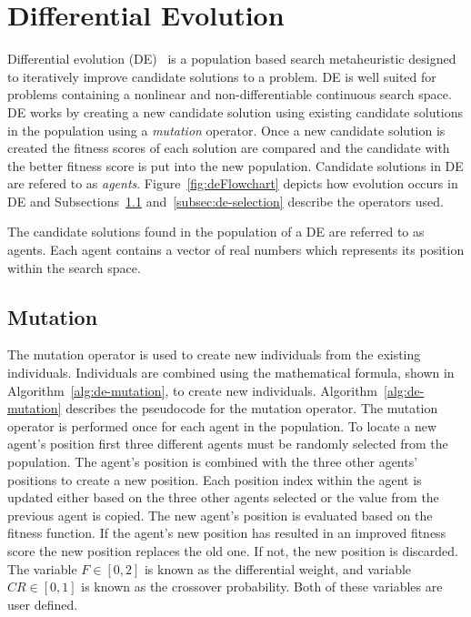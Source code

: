 \section{Differential Evolution}
\label{sec:de}

Differential evolution (DE)~\cite{storn1997differential} is a population based search metaheuristic designed to iteratively improve candidate solutions to a problem. DE is well suited for problems containing a nonlinear and non-differentiable continuous search space. DE works by creating a new candidate solution using existing candidate solutions in the population using a \textit{mutation} operator. Once a new candidate solution is created the fitness scores of each solution are compared and the candidate with the better fitness score is put into the new population. Candidate solutions in DE are refered to as \textit{agents}. Figure~\ref{fig:deFlowchart} depicts how evolution occurs in DE and Subsections~\ref{subsec:de-mutation} and~\ref{subsec:de-selection} describe the operators used.



The candidate solutions found in the population of a DE are referred to as agents. Each agent contains a vector of real numbers which represents its position within the search space.

\subsection{Mutation}
\label{subsec:de-mutation}

The mutation operator is used to create new individuals from the existing individuals. Individuals are combined using the mathematical formula, shown in Algorithm~\ref{alg:de-mutation}, to create new individuals. Algorithm~\ref{alg:de-mutation} describes the pseudocode for the mutation operator. The mutation operator is performed once for each agent in the population. To locate a new agent's position first three different agents must be randomly selected from the population. The agent's position is combined with the three other agents' positions to create a new position. Each position index within the agent is updated either based on the three other agents selected or the value from the previous agent is copied. The new agent's position is evaluated based on the fitness function. If the agent's new position has resulted in an improved fitness score the new position replaces the old one. If not, the new position is discarded. The variable $F \in [0,2]$ is known as the differential weight, and variable $CR \in [0,1]$ is known as the crossover probability. Both of these variables are user defined.

